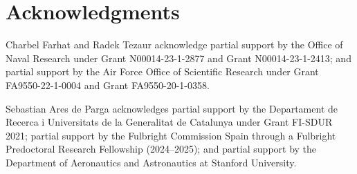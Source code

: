 \documentclass[preprint,10pt]{elsarticle}
\begin{document}
\section*{Acknowledgments}

Charbel Farhat and Radek Tezaur acknowledge partial support by the Office of Naval Research under Grant N00014-23-1-2877 and Grant N00014-23-1-2413; and partial support
by the Air Force Office of Scientific Research under Grant FA9550-22-1-0004 and Grant FA9550-20-1-0358.

Sebastian Ares de Parga acknowledges partial support by the Departament de Recerca i Universitats de la Generalitat de Catalunya under Grant FI-SDUR 2021; partial support by the 
Fulbright Commission Spain through a Fulbright Predoctoral Research Fellowship (2024–2025); and partial support by the Department of Aeronautics and Astronautics at Stanford 
University.



\end{document}
